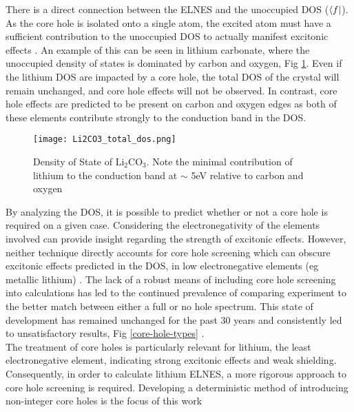 There is a direct connection between the ELNES and the unoccupied DOS ($\bra{f}$).  As the core hole is isolated onto a single atom, the excited atom must have a sufficient contribution to the unoccupied DOS to actually manifest excitonic effects  \cite{mauchamp_core-hole_2009}.   An example of this can be seen in lithium carbonate, where the unoccupied density of states is dominated by carbon and oxygen, Fig \ref{LCO_dos}.  Even if the lithium DOS are impacted by a core hole, the total DOS of the crystal will remain unchanged, and core hole effects will not be observed.  In contrast, core hole effects are predicted to be present on carbon and oxygen edges as both of these elements contribute strongly to the conduction band in the DOS. \\

\begin{figure}
	\centering
	\texttt{[image: Li2CO3\_total\_dos.png]}
	\caption{Density of State of $ \mathrm{Li_2CO_3} $. Note the minimal contribution of lithium to the conduction band at $ \sim $ 5eV relative to carbon and oxygen}
	\label{LCO_dos}
	
\end{figure}


By analyzing the DOS, it is possible to predict whether or not a core hole is required on a given case. Considering the electronegativity of the elements involved can provide insight regarding the strength of excitonic effects.  However, neither technique directly accounts for core hole screening which can obscure excitonic effects predicted in the DOS, in low electronegative elements (eg metallic lithium) \cite{mauchamp_ab_2006}. The lack of a robust means of including core hole screening into calculations has led to the continued prevalence of comparing experiment to the better match between either a full or no hole spectrum. This state of development has remained unchanged for the past 30 years and consistently led to unsatisfactory results, Fig \ref{core-hole-types} \cite{ brydson_further_1988, hardcastle_robust_2017,bad_hole1,bad_hole2, bad_hole3, bad_hole4, bad_hole5, bad_hole6, bad_hole7, bad_hole8,bad_hole9, bad_hole10}. \\

The treatment of core holes is particularly relevant for lithium, the least electronegative element, indicating strong excitonic effects and weak shielding. Consequently, in order to  calculate lithium ELNES, a more rigorous approach to core hole screening is required.  Developing a deterministic method of introducing non-integer core holes is the focus of this work


